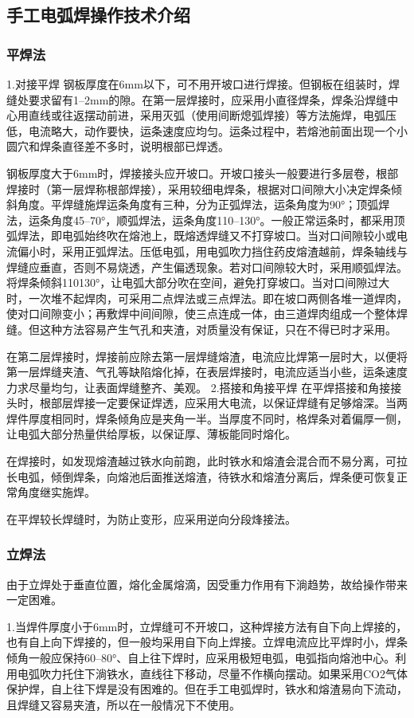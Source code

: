 \documentclass{ctexbook}
\begin{document}
\subsection{手工电弧焊操作技术介绍}
\subsubsection{平焊法}
1.对接平焊 钢板厚度在6mm以下，可不用开坡口进行焊接。但钢板在组装时，焊缝处要求留有1--2mm的隙。在第一层焊接时，应采用小直径焊条，焊条沿焊缝中心用直线或往返摆动前进，采用灭弧（使用间断熄弧焊接）等方法施焊，电弧压低，电流略大，动作要快，运条速度应均匀。运条过程中，若熔池前面出现一个小圆穴和焊条直径差不多时，说明根部已焊透。

钢板厚度大于6mm时，焊接接头应开坡口。开坡口接头一般要进行多层卷，根部焊接时（第一层焊称根部焊接），采用较细电焊条，根据对口间隙大小决定焊条倾斜角度。平焊缝施焊运条角度有三种，分为正弧焊法，运条角度为90°；顶弧焊法，运条角度45--70°，顺弧焊法，运条角度110--130°。一般正常运条时，都采用顶弧焊法，即电弧始终吹在熔池上，既熔透焊缝又不打穿坡口。当对口间隙较小或电流偏小时，采用正弧焊法。压低电弧，用电弧吹力挡住药皮熔渣越前，焊条轴线与焊缝应垂直，否则不易烧透，产生偏透现象。若对口间隙较大时，采用顺弧焊法。将焊条倾斜110130°，让电弧大部分吹在空间，避免打穿坡口。当对口间隙过大时，一次堆不起焊肉，可采用二点焊法或三点焊法。即在坡口两侧各堆一道焊肉，使对口间隙变小；再敷焊中间间隙，使三点连成一体，由三道焊肉组成一个整体焊缝。但这种方法容易产生气孔和夹渣，对质量没有保证，只在不得已时才采用。

在第二层焊接时，焊接前应除去第一层焊缝熔渣，电流应比焊第一层时大，以便将第一层焊缝夹渣、气孔等缺陷熔化掉，在表层焊接时，电流应适当小些，运条速度力求尽量均匀，让表面焊缝整齐、美观。
2.搭接和角接平焊 在平焊搭接和角接接头时，根部层焊接一定要保证焊透，应采用大电流，以保证焊缝有足够熔深。当两焊件厚度相同时，焊条倾角应是夹角一半。当厚度不同时，格焊条对着偏厚一侧，让电弧大部分热量供给厚板，以保证厚、薄板能同时熔化。

在焊接时，如发现熔渣越过铁水向前跑，此时铁水和熔渣会混合而不易分离，可拉长电弧，倾倒焊条，向熔池后面推送熔渣，待铁水和熔渣分离后，焊条便可恢复正常角度继实施焊。

在平焊较长焊缝时，为防止变形，应采用逆向分段烽接法。
\subsubsection{立焊法}
由于立焊处于垂直位置，熔化金属熔滴，因受重力作用有下淌趋势，故给操作带来一定困难。

1.当焊件厚度小于6mm时，立焊缝可不开坡口，这种焊接方法有自下向上焊接的，也有自上向下焊接的，但一般均采用自下向上焊接。立焊电流应比平焊时小，焊条倾角一般应保持60--80°、自上往下焊时，应采用极短电弧，电弧指向熔池中心。利用电弧吹力托住下淌铁水，直线往下移动，尽量不作横向摆动。如果采用CO2气体保护焊，自上往下焊是没有困难的。但在手工电弧焊时，铁水和熔渣易向下流动，且焊缝又容易夹渣，所以在一般情况下不使用。
\end{document}
